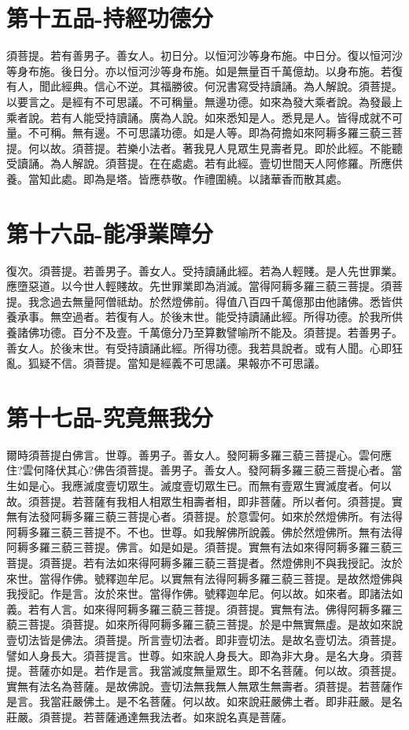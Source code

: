 \documentclass[a6paper, 22pt, twocolumn]{cvertbook}
\begin{document}
\chapter{第十五品-持經功德分}
須菩提。若有善男子。善女人。初日分。以恒河沙等身布施。中日分。復以恒河沙等身布施。後日分。亦以恒河沙等身布施。如是無量百千萬億劫。以身布施。若復有人，聞此經典。信心不逆。其福勝彼。何況書寫受持讀誦。為人解說。須菩提。以要言之。是經有不可思議。不可稱量。無邊功德。如來為發大乘者說。為發最上乘者說。若有人能受持讀誦。廣為人說。如來悉知是人。悉見是人。皆得成就不可量。不可稱。無有邊。不可思議功德。如是人等。即為荷擔如來阿耨多羅三藐三菩提。何以故。須菩提。若樂小法者。著我見人見眾生見壽者見。即於此經。不能聽受讀誦。為人解說。須菩提。在在處處。若有此經。壹切世間天人阿修羅。所應供養。當知此處。即為是塔。皆應恭敬。作禮圍繞。以諸華香而散其處。
\chapter{第十六品-能凈業障分}
復次。須菩提。若善男子。善女人。受持讀誦此經。若為人輕賤。是人先世罪業。應墮惡道。以今世人輕賤故。先世罪業即為消滅。當得阿耨多羅三藐三菩提。須菩提。我念過去無量阿僧祗劫。於然燈佛前。得值八百四千萬億那由他諸佛。悉皆供養承事。無空過者。若復有人。於後末世。能受持讀誦此經。所得功德。於我所供養諸佛功德。百分不及壹。千萬億分乃至算數譬喻所不能及。須菩提。若善男子。善女人。於後末世。有受持讀誦此經。所得功德。我若具說者。或有人聞。心即狂亂。狐疑不信。須菩提。當知是經義不可思議。果報亦不可思議。
\chapter{第十七品-究竟無我分}
爾時須菩提白佛言。世尊。善男子。善女人。發阿耨多羅三藐三菩提心。雲何應住?雲何降伏其心?佛告須菩提。善男子。善女人。發阿耨多羅三藐三菩提心者。當生如是心。我應滅度壹切眾生。滅度壹切眾生已。而無有壹眾生實滅度者。何以故。須菩提。若菩薩有我相人相眾生相壽者相，即非菩薩。所以者何。須菩提。實無有法發阿耨多羅三藐三菩提心者。須菩提。於意雲何。如來於然燈佛所。有法得阿耨多羅三藐三菩提不。不也。世尊。如我解佛所說義。佛於然燈佛所。無有法得阿耨多羅三藐三菩提。佛言。如是如是。須菩提。實無有法如來得阿耨多羅三藐三菩提。須菩提。若有法如來得阿耨多羅三藐三菩提者。然燈佛則不與我授記。汝於來世。當得作佛。號釋迦牟尼。以實無有法得阿耨多羅三藐三菩提。是故然燈佛與我授記。作是言。汝於來世。當得作佛。號釋迦牟尼。何以故。如來者。即諸法如義。若有人言。如來得阿耨多羅三藐三菩提。須菩提。實無有法。佛得阿耨多羅三藐三菩提。須菩提。如來所得阿耨多羅三藐三菩提。於是中無實無虛。是故如來說壹切法皆是佛法。須菩提。所言壹切法者。即非壹切法。是故名壹切法。須菩提。譬如人身長大。須菩提言。世尊。如來說人身長大。即為非大身。是名大身。須菩提。菩薩亦如是。若作是言。我當滅度無量眾生。即不名菩薩。何以故。須菩提。實無有法名為菩薩。是故佛說。壹切法無我無人無眾生無壽者。須菩提。若菩薩作是言。我當莊嚴佛土。是不名菩薩。何以故。如來說莊嚴佛土者。即非莊嚴。是名莊嚴。須菩提。若菩薩通達無我法者。如來說名真是菩薩。
\end{document}
